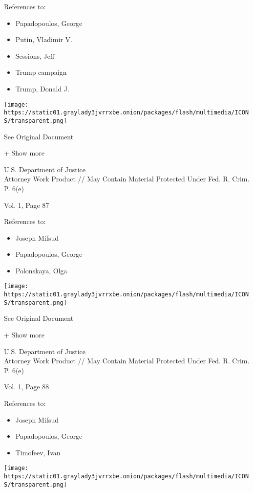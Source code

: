 References to:

\begin{itemize}
\tightlist
\item
  Papadopoulos, George
\item
  Putin, Vladimir V.
\item
  Sessions, Jeff
\item
  Trump campaign
\item
  Trump, Donald J.
\end{itemize}

\protect\hyperlink{}{}

\texttt{[image: https://static01.graylady3jvrrxbe.onion/packages/flash/multimedia/ICONS/transparent.png]}

See Original Document

+ Show more

U.S. Department of Justice\\
Attorney Work Product // May Contain Material Protected Under Fed. R.
Crim. P. 6(e)

Vol. 1, Page 87

References to:

\begin{itemize}
\tightlist
\item
  Joseph Mifsud
\item
  Papadopoulos, George
\item
  Polonskaya, Olga
\end{itemize}

\protect\hyperlink{}{}

\texttt{[image: https://static01.graylady3jvrrxbe.onion/packages/flash/multimedia/ICONS/transparent.png]}

See Original Document

+ Show more

U.S. Department of Justice\\
Attorney Work Product // May Contain Material Protected Under Fed. R.
Crim. P. 6(e)

Vol. 1, Page 88

References to:

\begin{itemize}
\tightlist
\item
  Joseph Mifsud
\item
  Papadopoulos, George
\item
  Timofeev, Ivan
\end{itemize}

\protect\hyperlink{}{}

\texttt{[image: https://static01.graylady3jvrrxbe.onion/packages/flash/multimedia/ICONS/transparent.png]}

